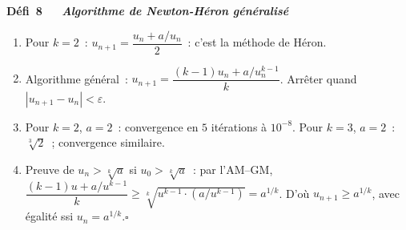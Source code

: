 \noindent{}
{\color{BO}\bfseries\small D\'efi~8~\textendash\ \textit{\algo\ Algorithme de Newton-H\'eron g\'en\'eralis\'e}}
\par\smallskip

\begin{enumerate}
  \item Pour $k=2$~: $u_{n+1}=\dfrac{u_n+a/u_n}{2}$~: c'est la m\'ethode de H\'eron.\checkmark
  \item Algorithme g\'en\'eral~: $u_{n+1}=\dfrac{(k-1)u_n+a/u_n^{k-1}}{k}$.
        Arr\^eter quand $|u_{n+1}-u_n|<\varepsilon$.
  \item Pour $k=2$, $a=2$~: convergence en $5$ it\'erations \`a $10^{-8}$.
        Pour $k=3$, $a=2$~: $\sqrt[3]{2}$~; convergence similaire.
  \item Preuve de $u_n>\sqrt[k]{a}$ si $u_0>\sqrt[k]{a}$~:
        par l'AM--GM, $\dfrac{(k-1)u+a/u^{k-1}}{k}\geq \sqrt[k]{u^{k-1}\cdot(a/u^{k-1})}=a^{1/k}$.
        D'o\`u $u_{n+1}\geq a^{1/k}$, avec \'egalit\'e ssi $u_n=a^{1/k}$.\hfill$\square$
\end{enumerate}


